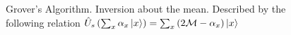 \begin{figure}
\centering



\caption{Grover's Algorithm. Inversion about
  the mean. Described by the following relation 
$\hat{U}_s\left(\sum_x \alpha_x \ket{x}\right) = 
\sum_x \left(2 \mathcal{M} - \alpha_x \right)\ket{x}$}
\label{figQuantCompGroverInvMiddle}
\end{figure}